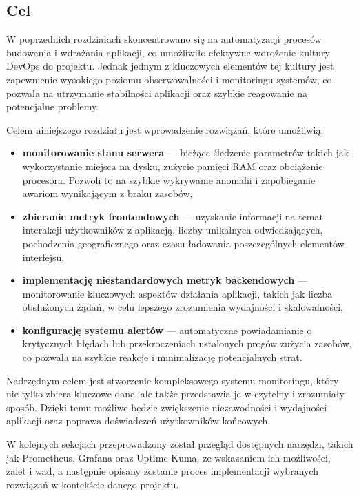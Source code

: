 \documentclass{article}
\begin{document}
\subsection{Cel}

W poprzednich rozdziałach skoncentrowano się na automatyzacji procesów budowania i wdrażania aplikacji, co umożliwiło efektywne wdrożenie kultury DevOps do projektu. Jednak jednym z kluczowych elementów tej kultury jest zapewnienie wysokiego poziomu obserwowalności i monitoringu systemów, co pozwala na utrzymanie stabilności aplikacji oraz szybkie reagowanie na potencjalne problemy.

Celem niniejszego rozdziału jest wprowadzenie rozwiązań, które umożliwią:

\begin{itemize}
    \item \textbf{monitorowanie stanu serwera} — bieżące śledzenie parametrów takich jak wykorzystanie miejsca na dysku, zużycie pamięci RAM oraz obciążenie procesora. Pozwoli to na szybkie wykrywanie anomalii i zapobieganie awariom wynikającym z braku zasobów,
    \item \textbf{zbieranie metryk frontendowych} — uzyskanie informacji na temat interakcji użytkowników z aplikacją, liczby unikalnych odwiedzających, pochodzenia geograficznego oraz czasu ładowania poszczególnych elementów interfejsu,
    \item \textbf{implementację niestandardowych metryk backendowych} — monitorowanie kluczowych aspektów działania aplikacji, takich jak liczba obsłużonych żądań, w celu lepszego zrozumienia wydajności i skalowalności,
    \item \textbf{konfigurację systemu alertów} — automatyczne powiadamianie o krytycznych błędach lub przekroczeniach ustalonych progów zużycia zasobów, co pozwala na szybkie reakcje i minimalizację potencjalnych strat.
\end{itemize}

Nadrzędnym celem jest stworzenie kompleksowego systemu monitoringu, który nie tylko zbiera kluczowe dane, ale także przedstawia je w czytelny i zrozumiały sposób. Dzięki temu możliwe będzie zwiększenie niezawodności i wydajności aplikacji oraz poprawa doświadczeń użytkowników końcowych.

W kolejnych sekcjach przeprowadzony został przegląd dostępnych narzędzi, takich jak Prometheus, Grafana oraz Uptime Kuma, ze wskazaniem ich możliwości, zalet i wad, a następnie opisany zostanie proces implementacji wybranych rozwiązań w kontekście danego projektu.
\end{document}
